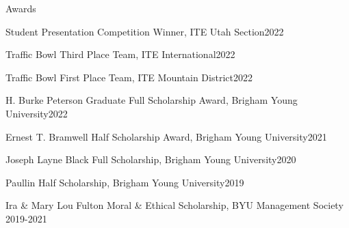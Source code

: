 \documentclass{resume} %
\begin{document}

\begin{rSection}{Awards}
\begin{esSubsection}{Student Presentation Competition Winner,}{ ITE Utah Section}{2022}{}{}
\end{esSubsection}
\begin{esSubsection}{Traffic Bowl Third Place Team,}{ ITE International}{2022}{}{}
\end{esSubsection}
\begin{esSubsection}{Traffic Bowl First Place Team,}{ ITE Mountain District}{2022}{}{}
\end{esSubsection}
\begin{esSubsection}{H. Burke Peterson Graduate Full Scholarship Award,}{ Brigham Young University}{2022}{}{}
\end{esSubsection}
\begin{esSubsection}{Ernest T. Bramwell Half Scholarship Award,}{ Brigham Young University}{2021}{}{}
\end{esSubsection}
\begin{esSubsection}{Joseph Layne Black Full Scholarship,}{ Brigham Young University}{2020}{}{}
\end{esSubsection}
\begin{esSubsection}{Paullin Half Scholarship,}{ Brigham Young University}{2019}{}{}
\end{esSubsection}
\begin{esSubsection}{Ira \& Mary Lou Fulton Moral \& Ethical Scholarship,}{ BYU Management Society}{ 2019-2021}{}{}
\end{esSubsection}
\end{rSection}



\end{document}
